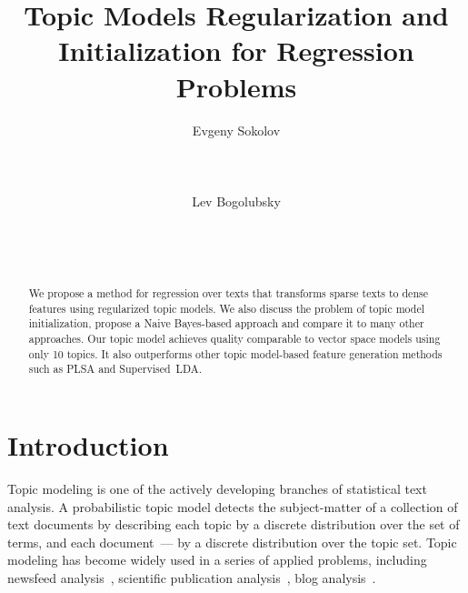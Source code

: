 \documentclass{sig-alternate-2013}
\begin{document}
\title{Topic Models Regularization and Initialization for Regression Problems}
\author{
\alignauthor
Evgeny Sokolov\\
       \\
       \\
       \\
\alignauthor
Lev Bogolubsky\\
       \\
       \\
       \\
}
\maketitle


\begin{abstract}
    We propose a method for regression over texts
    that transforms sparse texts to dense features
    using regularized topic models.
    We also discuss the problem of topic model
    initialization, propose a Naive Bayes-based
    approach and compare it to many other approaches.
    Our topic model achieves quality
    comparable to vector space models using only 10 topics.
    It also outperforms other topic model-based
    feature generation methods such as PLSA
    and Supervised~LDA.
\end{abstract}



\section{Introduction}

Topic modeling is one of the actively developing branches of statistical text analysis.
A probabilistic topic model detects the subject-matter of a collection of text documents by describing each topic by a discrete distribution over the set of terms, and each document~--- by a discrete distribution over the topic set. Topic modeling has become widely used in a series of applied problems, including newsfeed analysis~\cite{newman06newsfeed}, scientific publication analysis~\cite{griffiths04scientific}, blog analysis~\cite{paul09blogs}.
\end{document}
